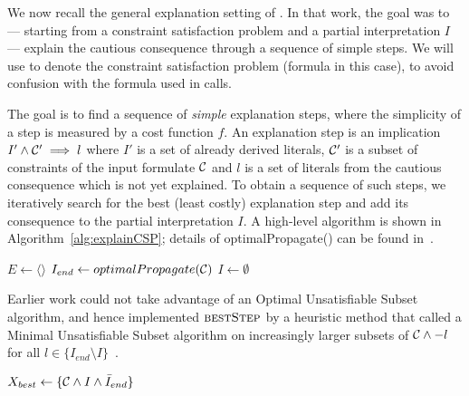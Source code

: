 
We now recall the general explanation setting of \citet{ecai/BogaertsGCG20}. 
In that work, the goal was to --- starting from a constraint satisfaction problem and a partial interpretation $I$ --- explain the cautious consequence through a sequence of simple steps. 
We will use \formulac to denote the constraint satisfaction problem (formula in this case), to avoid confusion with the formula \formula used in \omus calls.

The goal is to find a sequence of \textit{simple} explanation steps, where the simplicity of a step is measured by a cost function $f$. 
An explanation step is an implication $I' \wedge \mathcal{C} ' \implies l$ where $I'$ is a set of already derived literals, $\mathcal{C} '$ is a subset of constraints of the input formulate $\mathcal{C} $ and $l$ is a set of literals from the cautious consequence which is not yet explained.
To obtain a sequence of such steps, we iteratively search for the best (least costly) explanation step and add its consequence to the partial interpretation $I$. A high-level algorithm is shown in Algorithm~\ref{alg:explainCSP}; details of optimalPropagate() can be found in~\cite{ecai/BogaertsGCG20}.

\begin{algorithm}[ht]
  \caption{$\call{ExplainCSP}(\formulac,f)$}
  \label{alg:explainCSP}
$E \gets \langle \rangle$\;
$I_{end} \gets optimalPropagate(\mathcal{C} )$\;
$I \gets \emptyset$\;
\;
\end{algorithm}

Earlier work could not take advantage of an Optimal Unsatisfiable Subset algorithm, and hence implemented $\textsc{bestStep}$ by a heuristic method that called a Minimal Unsatisfiable Subset algorithm on increasingly larger subsets of $\mathcal{C}  \wedge -l$ for all $l \in \{I_{end} \setminus I\}$~\cite{ecai/BogaertsGCG20}.


\begin{algorithm}[ht]
  \caption{$\call{bestStep--OUS}({\cal C},f,I,I_{end})$}
  \label{alg:bestStepOUS}
$X_{best} \gets \{{\cal C} \land I \land \bar{I}_{end}\}$\;
\end{algorithm}

